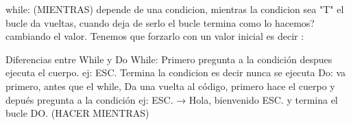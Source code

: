 while: (MIENTRAS)
depende de una condicion, mientras la condicion sea "T" el bucle da vueltas, cuando deja de serlo el bucle termina
como lo hacemos? cambiando el valor.
Tenemos que forzarlo con un valor inicial es decir :

Diferencias entre While y Do
While: Primero pregunta a la condición despues ejecuta el cuerpo.
ej: ESC. Termina la condicion es decir nunca se ejecuta
Do: va primero, antes que el while, Da una vuelta al código, primero hace el cuerpo y depués pregunta a la condición
ej: ESC. → Hola, bienvenido ESC. y termina el bucle
DO. (HACER MIENTRAS)